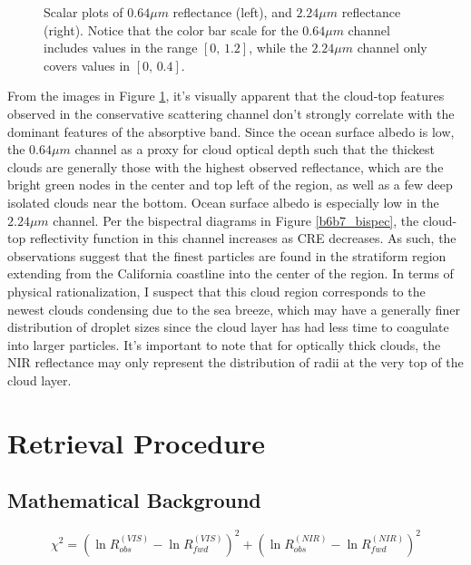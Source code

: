 \documentclass[12pt]{article}
\begin{document}
\begin{figure}[h!]
\begin{center}
{        }
    \end{center}
    \caption{Scalar plots of $0.64\mu m$ reflectance (left), and $2.24\mu m$ reflectance (right). Notice that the color bar scale for the $0.64\mu m$ channel includes values in the range $[0,\,1.2]$, while the $2.24\mu m$ channel only covers values in $[0,\,0.4]$.}
    \label{region_scalars}
\end{figure}

From the images in Figure \ref{region_scalars}, it's visually apparent that the cloud-top features observed in the conservative scattering channel don't strongly correlate with the dominant features of the absorptive band. Since the ocean surface albedo is low, the $0.64\mu m$ channel as a proxy for cloud optical depth such that the thickest clouds are generally those with the highest observed reflectance, which are the bright green nodes in the center and top left of the region, as well as a few deep isolated clouds near the bottom. Ocean surface albedo is especially low in the $2.24\mu m$ channel. Per the bispectral diagrams in Figure \ref{b6b7_bispec}, the cloud-top reflectivity function in this channel increases as CRE decreases. As such, the observations suggest that the finest particles are found in the stratiform region extending from the California coastline into the center of the region. In terms of physical rationalization, I suspect that this cloud region corresponds to the newest clouds condensing due to the sea breeze, which may have a generally finer distribution of droplet sizes since the cloud layer has had less time to coagulate into larger particles. It's important to note that for optically thick clouds, the NIR reflectance may only represent the distribution of radii at the very top of the cloud layer.

\section{Retrieval Procedure}

\subsection{Mathematical Background}

\begin{equation}\label{chi2}
    \chi^2 = \left(\ln{R^{(VIS)}_{obs}}-\ln{R^{(VIS)}_{fwd}}\right)^2 + \left(\ln{R^{(NIR)}_{obs}}-\ln{R^{(NIR)}_{fwd}}\right)^2
\end{equation}
\end{document}
